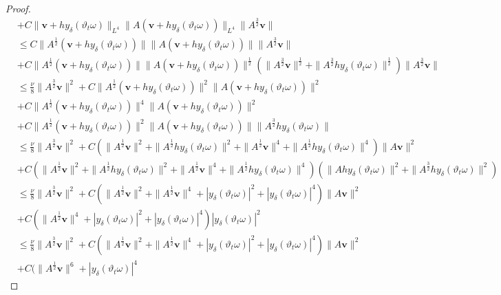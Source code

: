 \documentclass{elsarticle}
\theoremstyle{definition}
\numberwithin{equation}{section}
\begin{document}
\begin{proof}
\begin{align}
&+C\|\textbf{v}+hy_\delta(\vartheta_t\omega)\|_{L^4}\|A(\textbf{v}+hy_\delta(\vartheta_t\omega))\|_{L^4}
\|A^{\frac{3}{2}}\textbf{v}\|\nonumber\\
&\leq C\|A^{\frac{1}{2}}(\textbf{v}+hy_\delta(\vartheta_t\omega))\|\|A(\textbf{v}+hy_\delta(\vartheta_t\omega))\|
\|A^{\frac{3}{2}}\textbf{v}\|\nonumber\\
&+C\|A^{\frac{1}{2}}(\textbf{v}+hy_\delta(\vartheta_t\omega))\|\|A(\textbf{v}+hy_\delta(\vartheta_t\omega))\|^\frac12
(\|A^{\frac{3}{2}}\textbf{v}\|^\frac12+\|A^{\frac{3}{2}}hy_\delta(\vartheta_t\omega)\|^\frac12)\|A^{\frac{3}{2}}\textbf{v}\|\nonumber\\
&\leq \frac\nu8\|A^{\frac{3}{2}}\textbf{v}\|^2
+C\|A^{\frac{1}{2}}(\textbf{v}+hy_\delta(\vartheta_t\omega))\|^2\|A(\textbf{v}+hy_\delta(\vartheta_t\omega))\|^2\nonumber\\
&+C\|A^{\frac{1}{2}}(\textbf{v}+hy_\delta(\vartheta_t\omega))\|^4\|A(\textbf{v}+hy_\delta(\vartheta_t\omega))\|^2\nonumber\\
&+C\|A^{\frac{1}{2}}(\textbf{v}+hy_\delta(\vartheta_t\omega))\|^2\|A(\textbf{v}+hy_\delta(\vartheta_t\omega))\|
\|A^{\frac{3}{2}}hy_\delta(\vartheta_t\omega)\|\nonumber\\
&\leq \frac\nu8\|A^{\frac{3}{2}}\textbf{v}\|^2
+C(\|A^{\frac{1}{2}}\textbf{v}\|^2+\|A^{\frac{1}{2}}hy_\delta(\vartheta_t\omega)\|^2
+\|A^{\frac{1}{2}}\textbf{v}\|^4+\|A^{\frac{1}{2}}hy_\delta(\vartheta_t\omega)\|^4)\|A\textbf{v}\|^2
\nonumber\\
&+C(\|A^{\frac{1}{2}}\textbf{v}\|^2+\|A^{\frac{1}{2}}hy_\delta(\vartheta_t\omega)\|^2
+\|A^{\frac{1}{2}}\textbf{v}\|^4+\|A^{\frac{1}{2}}hy_\delta(\vartheta_t\omega)\|^4)
(\|Ahy_\delta(\vartheta_t\omega)\|^2+\|A^\frac32hy_\delta(\vartheta_t\omega)\|^2)
\nonumber\\
&\leq \frac\nu8\|A^{\frac{3}{2}}\textbf{v}\|^2
+C(\|A^{\frac{1}{2}}\textbf{v}\|^2
+\|A^{\frac{1}{2}}\textbf{v}\|^4+|y_\delta(\vartheta_t\omega)|^2+|y_\delta(\vartheta_t\omega)|^4)\|A\textbf{v}\|^2
\nonumber\\
&+C(\|A^{\frac{1}{2}}\textbf{v}\|^4+|y_\delta(\vartheta_t\omega)|^2
+|y_\delta(\vartheta_t\omega)|^4)|y_\delta(\vartheta_t\omega)|^2\nonumber\\
&\leq \frac\nu8\|A^{\frac{3}{2}}\textbf{v}\|^2
+C(\|A^{\frac{1}{2}}\textbf{v}\|^2
+\|A^{\frac{1}{2}}\textbf{v}\|^4+|y_\delta(\vartheta_t\omega)|^2+|y_\delta(\vartheta_t\omega)|^4)\|A\textbf{v}\|^2
\nonumber\\
&+C(\|A^{\frac{1}{2}}\textbf{v}\|^6+|y_\delta(\vartheta_t\omega)|^4

\end{align}
\end{proof}
\end{document}
